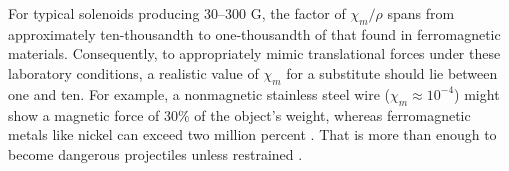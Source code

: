 For typical solenoids producing 30–300 G, the factor of $\chi_m/\rho$ spans from approximately ten-thousandth to one-thousandth of that found in ferromagnetic materials. Consequently, to appropriately mimic translational forces under these laboratory conditions, a realistic value of $\chi_m$ for a substitute should lie between one and ten. For example, a nonmagnetic stainless steel wire ($\chi_m \approx 10^{-4}$) might show a magnetic force of 30\% of the object's weight, whereas ferromagnetic metals like nickel can exceed two million percent \cite{panych2018,Woods2021_MRIdisplacement,aboyewa2021}. That is more than enough to become dangerous projectiles unless restrained .

